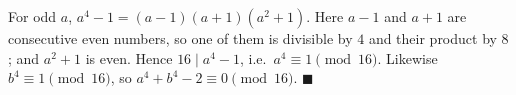 For odd $a$, $a^4-1=(a-1)(a+1)(a^2+1)$. Here $a-1$ and $a+1$ are consecutive even numbers, so one of them is divisible by $4$ and their product by $8$; and $a^2+1$ is even. Hence $16\mid a^4-1$, i.e.\ $a^4\equiv1\pmod{16}$. Likewise $b^4\equiv1\pmod{16}$, so $a^4+b^4-2\equiv0\pmod{16}$. $\blacksquare$
